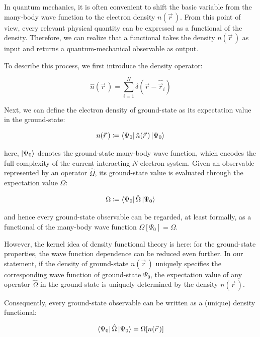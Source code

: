 In quantum mechanics, it is often convenient to shift the basic variable from the many-body wave function to the electron density $n(\vec{r}\,)$.
From this point of view, every relevant physical quantity can be expressed as a functional of the density.
Therefore, we can realize that a functional takes the density $n(\vec{r}\,)$ as input and returns a quantum-mechanical observable as output.

To describe this process, we first introduce the density operator:

\begin{equation}
    \hat{n}(\vec{r}\,) = \sum_{i=1}^N \delta(\vec{r}-\hat{\vec{r}}_i)
\label{density_operator}
\end{equation}

Next, we can define the electron density of ground-state as its expectation value in the ground-state:

\begin{equation}
    n(\vec{r}\,)\coloneqq\bra{\Psi_0}\hat{n}(\vec{r}\,)\ket{\Psi_0}
\label{electron_density_definition}
\end{equation}

here, $\ket{\Psi_0}$ denotes the ground-state many-body wave function, which encodes the full complexity of the current interacting $N$-electron system.
Given an observable represented by an operator $\hat{\Omega}$, its ground-state value is evaluated through the expectation value $\Omega$:

\begin{equation}
    \Omega \coloneqq \bra{\Psi_0}\hat{\Omega}\ket{\Psi_0}
\label{electron_density_expectation}
\end{equation}

and hence every ground-state observable can be regarded, at least formally, as a functional of the many-body wave function $\Omega[\Psi_0]=\Omega$.

However, the kernel idea of density functional theory is here: for the ground-state properties, the wave function dependence can be reduced even further. In our statement, if the density of ground-state $n(\vec{r}\,)$ uniquely specifies the corresponding wave function of ground-state $\Psi_0$,
the expectation value of any operator $\hat{\Omega}$ in the ground-state is uniquely determined by the density $n(\vec{r}\,)$.

Consequently, every ground-state observable can be written as a (unique) density functional:

\begin{equation}
    \bra{\Psi_0}\hat{\Omega}\ket{\Psi_0}=\Omega[n(\vec{r}\,)]
\label{ground_state_observable_expectation_value}
\end{equation}

